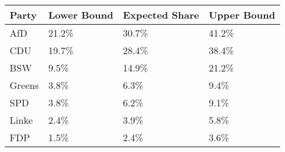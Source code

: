 \begin{tabular}{llll}
  \hline
Party & Lower Bound & Expected Share & Upper Bound \\ 
  \hline
AfD & 21.2\% & 30.7\% & 41.2\% \\ 
  CDU & 19.7\% & 28.4\% & 38.4\% \\ 
  BSW & 9.5\% & 14.9\% & 21.2\% \\ 
  Greens & 3.8\% & 6.3\% & 9.4\% \\ 
  SPD & 3.8\% & 6.2\% & 9.1\% \\ 
  Linke & 2.4\% & 3.9\% & 5.8\% \\ 
  FDP & 1.5\% & 2.4\% & 3.6\% \\ 
   \hline
\end{tabular}
